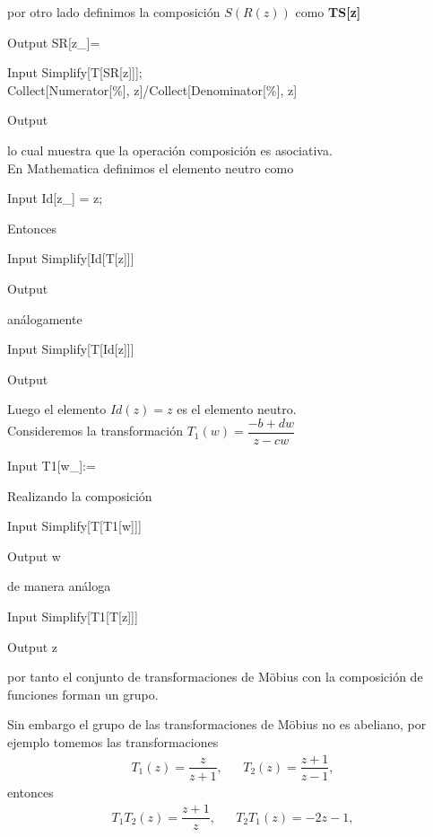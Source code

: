 \begin{prop}
por otro lado definimos la composición $S(R(z))$ como \textbf{TS[z]}
\begin{mmaCell}[moredefined={f, d}]{Output}
	  SR[z_]=
\end{mmaCell}
\begin{mmaCell}{Input}
	 Simplify[T[SR[z]]];\\Collect[Numerator[\%], z]/Collect[Denominator[\%], z]
\end{mmaCell}
\begin{mmaCell}[moredefined={f}]{Output}
\end{mmaCell}
lo cual muestra que la operación composición es asociativa.\\
En Mathematica definimos el elemento neutro como
\begin{mmaCell}{Input}
	 Id[z_] = z;
\end{mmaCell}
Entonces 
\begin{mmaCell}{Input}
	 Simplify[Id[T[z]]]
\end{mmaCell}
\begin{mmaCell}{Output}
\end{mmaCell}
análogamente 
\begin{mmaCell}{Input}
	 Simplify[T[Id[z]]]
\end{mmaCell}
\begin{mmaCell}{Output}
\end{mmaCell}
Luego el elemento $Id(z)=z$ es el elemento neutro.\\
Consideremos la transformación $T_1(w)=\dfrac{-b+dw}{z-cw}$ 
\begin{mmaCell}{Input}
	  T1[w_]:=
\end{mmaCell}
Realizando la composición 

\begin{mmaCell}{Input}
	  Simplify[T[T1[w]]]
\end{mmaCell}
\begin{mmaCell}{Output}
	 w
\end{mmaCell}
de manera análoga 

\begin{mmaCell}{Input}
	 Simplify[T1[T[z]]]
\end{mmaCell}
\begin{mmaCell}{Output}
	 z
\end{mmaCell}
por tanto el conjunto de transformaciones de M\"obius con la composición de funciones forman un grupo.\endproof
\end{prop}
Sin embargo el grupo de las transformaciones de M\"obius  no es abeliano, por ejemplo tomemos las transformaciones
\[
	\begin{array}{ccl}
		T_1(z)=\dfrac{z}{z+1},&&T_2(z)=\dfrac{z+1}{z-1},
	\end{array}
\]
entonces 
\[
\begin{array}{ccl}
	T_1T_2(z)=\dfrac{z+1}{z},&&T_2T_1(z)=-2z-1,
\end{array}
\]

